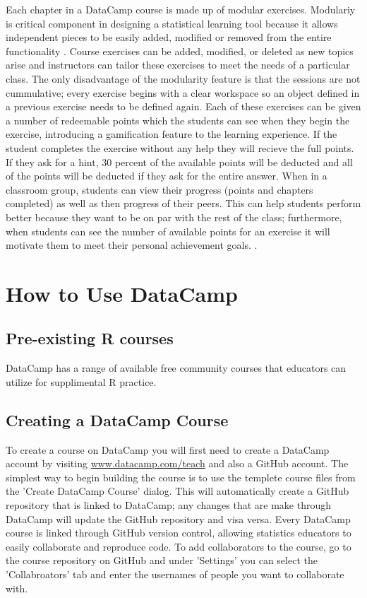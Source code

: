 \documentclass[12pt]{article}
\begin{document}
Each chapter in a DataCamp course is made up of modular exercises. Modulariy is critical component in designing a statistical
learning tool because it allows independent pieces to be easily added, modified or removed from the entire functionality
\cite{Hare2017}. Course exercises can be added, modified, or deleted as new topics arise and instructors can tailor
these exercises to meet the needs of a particular class. The only disadvantage of the modularity feature is that the sessions
are not cummulative; every exercise begins with a clear workspace so an object defined in a previous exercise needs to be
defined again. Each of these exercises can be given a number of redeemable points which the students can see when they begin
the exercise, introducing a gamification feature to the learning experience. If the student completes the exercise without
any help they will recieve the full points. If they ask for a hint, 30 percent of the available points will be deducted and
all of the points will be deducted if they ask for the entire answer. When in a classroom group, students can view their
progress (points and chapters completed) as well as then progress of their peers. This can help students perform better
because they want to be on par with the rest of the class; furthermore, when students can see the number of available points
for an exercise it will motivate them to meet their personal achievement goals. \citep{Chang2016}.


\section{How to Use DataCamp}

\subsection{Pre-existing R courses}
DataCamp has a range of available free community courses that educators can utilize for supplimental R practice.

\subsection{Creating a DataCamp Course}
To create a course on DataCamp you will first need to create a DataCamp account by visiting \url{www.datacamp.com/teach} and
also a GitHub account. The simplest way to begin building the course is to use the templete course files from the 'Create
DataCamp Course' dialog. This will automatically create a GitHub repository that is linked to DataCamp; any changes that are
make through DataCamp will update the GitHub repository and visa versa. Every DataCamp course is linked through GitHub version control,
allowing statistics educators to easily collaborate and reproduce code. To add collaborators to the course, go to the course repository
on GitHub and under 'Settings' you can select the 'Collabroators' tab and enter the usernames of people you want to collaborate with.
\end{document}
